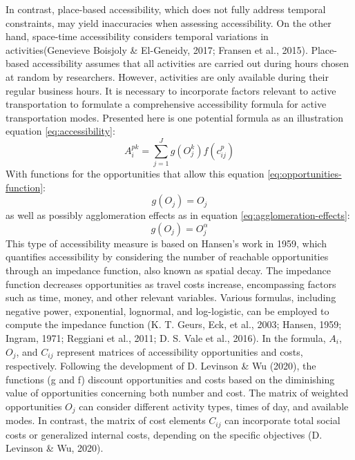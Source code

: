 \documentclass[12pt,twoside]{reedthesis}
\begin{document}
In contrast, place-based accessibility, which does not fully address temporal constraints, may yield inaccuracies when assessing accessibility. On the other hand, space-time accessibility considers temporal variations in activities(Genevieve Boisjoly \& El-Geneidy, 2017; Fransen et al., 2015). Place-based accessibility assumes that all activities are carried out during hours chosen at random by researchers. However, activities are only available during their regular business hours. It is necessary to incorporate factors relevant to active transportation to formulate a comprehensive accessibility formula for active transportation modes. Presented here is one potential formula as an illustration equation \eqref{eq:accessibility}:
\begin{equation}
A^{pk}_i = \sum _{j=1} ^ {J} g(O^ k_{j}) f(c^p_{ij})
\label{eq:accessibility}
\end{equation}
With functions for the opportunities that allow this equation \eqref{eq:opportunities-function}:
\begin{equation}
g(O_j) = O_j
\label{eq:opportunities-function}
\end{equation}
\noindent as well as possibly agglomeration effects as in equation \eqref{eq:agglomeration-effects}:
\begin{equation}
g(O_j) = O^\alpha_j
\label{eq:agglomeration-effects}
\end{equation}
This type of accessibility measure is based on Hansen's work in 1959, which quantifies accessibility by considering the number of reachable opportunities through an impedance function, also known as spatial decay. The impedance function decreases opportunities as travel costs increase, encompassing factors such as time, money, and other relevant variables. Various formulas, including negative power, exponential, lognormal, and log-logistic, can be employed to compute the impedance function (K. T. Geurs, Eck, et al., 2003; Hansen, 1959; Ingram, 1971; Reggiani et al., 2011; D. S. Vale et al., 2016). In the formula, \(A_i\), \(O_j\), and \(C_{ij}\) represent matrices of accessibility opportunities and costs, respectively. Following the development of D. Levinson \& Wu (2020), the functions (g and f) discount opportunities and costs based on the diminishing value of opportunities concerning both number and cost. The matrix of weighted opportunities \(O_j\) can consider different activity types, times of day, and available modes. In contrast, the matrix of cost elements \(C_{ij}\) can incorporate total social costs or generalized internal costs, depending on the specific objectives (D. Levinson \& Wu, 2020).
\end{document}
